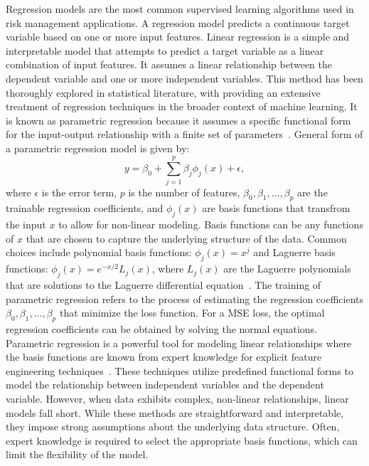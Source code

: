 Regression models are the most common supervised learning algorithms used in risk management applications.
A regression model predicts a continuous target variable based on one or more input features.
Linear regression is a simple and interpretable model that attempts to predict a target variable as a linear combination of input features. 
It assumes a linear relationship between the dependent variable and one or more independent variables. 
This method has been thoroughly explored in statistical literature, with \citet{bishop2006pattern} providing an extensive treatment of regression techniques in the broader context of machine learning.
It is known as parametric regression because it assumes a specific functional form for the input-output relationship with a finite set of parameters~\citep{seber2012linear}.
General form of a parametric regression model is given by:
\begin{equation}
    y = \beta_0 + \sum_{j=1}^{p} \beta_j \phi_j(x) + \epsilon,
\end{equation}
where $\epsilon$ is the error term, $p$ is the number of features, $\beta_0, \beta_1, \ldots, \beta_p$ are the trainable regression coefficients, and $\phi_j(x)$ are basis functions that transfrom the input $x$ to allow for non-linear modeling.
Basis functions can be any functions of $x$ that are chosen to capture the underlying structure of the data.
Common choices include polynomial basis functions: $\phi_j(x) = x^j$ and Laguerre basis functions: $\phi_j(x) = e^{-x/2} L_j(x)$, where $L_j(x)$ are the Laguerre polynomials that are solutions to the Laguerre differential equation~\citep{szeg1939orthogonal}.
The training of parametric regression refers to the process of estimating the regression coefficients $\beta_0, \beta_1, \ldots, \beta_p$ that minimize the loss function.
For a MSE loss, the optimal regression coefficients can be obtained by solving the normal equations.
Parametric regression is a powerful tool for modeling linear relationships where the basis functions are known from expert knowledge for explicit feature engineering techniques~\citep{hastie2009elements}.
These techniques utilize predefined functional forms to model the relationship between independent variables and the dependent variable. 
However, when data exhibits complex, non-linear relationships, linear models fall short. 
While these methods are straightforward and interpretable, they impose strong assumptions about the underlying data structure.
Often, expert knowledge is required to select the appropriate basis functions, which can limit the flexibility of the model.
